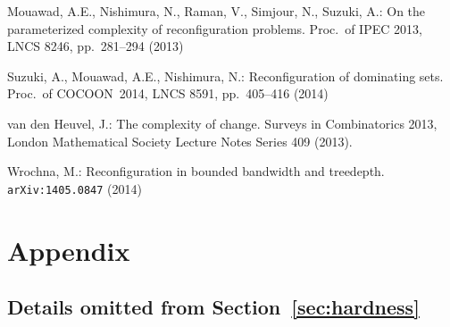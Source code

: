 \documentclass{llncs}
\begin{document}
\begin{thebibliography}{99}
Mouawad, A.E., Nishimura, N., Raman, V., Simjour, N., Suzuki, A.:
On the parameterized complexity of reconfiguration problems.
Proc.~of IPEC 2013, LNCS 8246, pp.~281--294 (2013)



Suzuki, A., Mouawad, A.E., Nishimura, N.:
Reconfiguration of dominating sets.
Proc.~of COCOON~2014, LNCS 8591, pp.~405--416 (2014)



van den Heuvel, J.:
The complexity of change.
Surveys in Combinatorics 2013,
London Mathematical Society Lecture Notes Series 409 (2013).

Wrochna, M.:
Reconfiguration in bounded bandwidth and treedepth.
{\tt  arXiv:1405.0847} (2014)

\end{thebibliography}

\newpage
\appendix
\section*{Appendix}
\renewcommand{\thesubsection}{\Alph{subsection}}

\subsection{Details omitted from Section~\ref{sec:hardness}}
\end{document}
